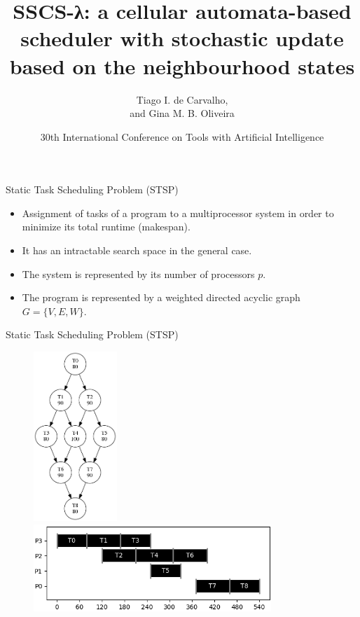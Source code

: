 \documentclass{beamer}
\title[Bio-inspired and Heuristic Methods]{SSCS-λ: a cellular automata-based scheduler with stochastic update based on the neighbourhood states}
\author{Tiago I. de Carvalho, \\ and Gina M. B. Oliveira}
\institute{Universidade Federal de Uberlândia}
\date{30th International Conference on Tools with Artificial Intelligence}
\begin{document}
\begin{frame}
  \titlepage
\end{frame}


\begin{frame}{Static Task Scheduling Problem (STSP)}
\begin{itemize}
  \item Assignment of tasks of a program to a multiprocessor system in order to minimize its total runtime (makespan).
  \item It has an intractable search space in the general
case.
  \item The system is represented by its number of processors $p$.
  \item The program is represented by a weighted directed acyclic graph $G = \{V,E,W\}$.
\end{itemize}
\end{frame}

\begin{frame}{Static Task Scheduling Problem (STSP)}

\begin{figure}
\includegraphics[width=0.28\textwidth,valign=c]{laplace9.png}%
\includegraphics[width=0.80\textwidth,valign=c]{gantt_lap9.png}
\end{figure}
\end{frame}
\end{document}
